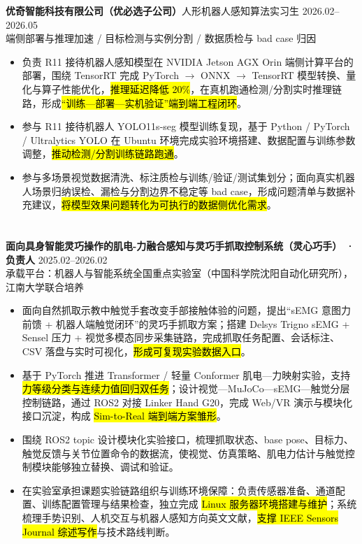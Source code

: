 \vspace{0.30em}
{\small\textbf{优奇智能科技有限公司（优必选子公司）}}\quad 人形机器人感知算法实习生 \hfill {2026.02--2026.05} \\
{\scriptsize\color{WHU_Blue} 端侧部署与推理加速 / 目标检测与实例分割 / 数据质检与 bad case 归因}
\begin{itemize}
    \item 负责 R11 接待机器人感知模型在 NVIDIA Jetson AGX Orin 端侧计算平台的部署，围绕 TensorRT 完成 PyTorch $\rightarrow$ ONNX $\rightarrow$ TensorRT 模型转换、量化与算子性能优化，\hl{推理延迟降低 20\%}，在真机跑通检测/分割实时推理链路，形成\hl{“训练—部署—实机验证”端到端工程闭环}。
    \item 参与 R11 接待机器人 YOLO11s-seg 模型训练复现，基于 Python / PyTorch / Ultralytics YOLO 在 Ubuntu 环境完成实验环境搭建、数据配置与训练参数调整，\hl{推动检测/分割训练链路跑通}。
    \item 参与多场景视觉数据清洗、标注质检与训练/验证/测试集划分；面向真实机器人场景归纳误检、漏检与分割边界不稳定等 bad case，形成问题清单与数据补充建议，\hl{将模型效果问题转化为可执行的数据侧优化需求}。
\end{itemize}

\section[科研与项目经历]{}
{\small\textbf{面向具身智能灵巧操作的肌电-力融合感知与灵巧手抓取控制系统（灵心巧手） · 负责人}} \hfill {2025.02--2026.02} \\
{\scriptsize\color{WHU_Blue} 承载平台：机器人与智能系统全国重点实验室（中国科学院沈阳自动化研究所），江南大学联合培养}
\begin{itemize}
    \item 面向自然抓取示教中触觉手套改变手部接触体验的问题，提出“sEMG 意图力前馈 + 机器人端触觉闭环”的灵巧手抓取方案；搭建 Delsys Trigno sEMG + Sensel 压力 + 视觉多模态同步采集链路，完成抓取任务配置、会话标注、CSV 落盘与实时可视化，\hl{形成可复现实验数据入口}。
    \item 基于 PyTorch 推进 Transformer / 轻量 Conformer 肌电—力映射实验，支持\hl{力等级分类与连续力值回归双任务}；设计视觉—MuJoCo—sEMG—触觉分层控制链路，通过 ROS2 对接 Linker Hand G20，完成 Web/VR 演示与模块化接口沉淀，构成 \hl{Sim-to-Real 端到端方案雏形}。
    \item 围绕 ROS2 topic 设计模块化实验接口，梳理抓取状态、base pose、目标力、触觉反馈与关节位置命令的数据流，使视觉、仿真策略、肌电力估计与触觉控制模块能够独立替换、调试和验证。
    \item 在实验室承担课题实验链路组织与训练环境保障：负责传感器准备、通道配置、训练配置管理与结果检查，独立完成 \hl{Linux 服务器环境搭建与维护}；系统梳理手势识别、人机交互与机器人感知方向英文文献，\hl{支撑 IEEE Sensors Journal 综述写作}与技术路线判断。
\end{itemize}

